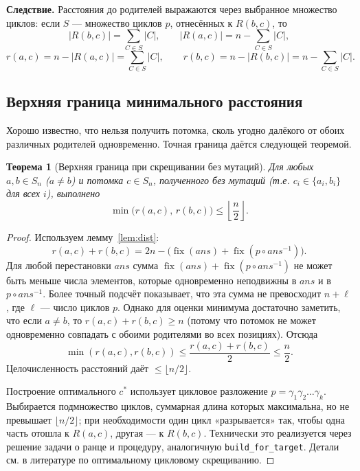 \documentclass[732]{studrep}
\DeclareMathOperator{\fix}{fix}          %
\newcommand{\ans}{\mathit{ans}}          %
\newtheorem{theorem}{Теорема}[section]
\theoremstyle{nonumberplain}
\newtheorem{proof}{Доказательство}
\begin{document}
\textbf{Следствие.} Расстояния до родителей выражаются через выбранное множество циклов: если $S$ — множество циклов $p$, отнесённых к $R(b,c)$, то
\[
|R(b,c)| = \sum_{C\in S} |C|,\qquad |R(a,c)| = n - \sum_{C\in S} |C|,
\]
\[
r(a,c) = n - |R(a,c)| = \sum_{C\in S} |C|,\qquad
r(b,c) = n - |R(b,c)| = n - \sum_{C\in S} |C|.
\]

\subsection{Верхняя граница минимального расстояния}
\label{sec:upper_bound}

Хорошо известно, что нельзя получить потомка, сколь угодно далёкого от обоих различных родителей одновременно. Точная граница даётся следующей теоремой.

\begin{theorem}[Верхняя граница при скрещивании без мутаций]\label{thm:bound}
Для любых $a,b\in S_n$ ($a\neq b$) и потомка $c\in S_n$, полученного без мутаций (т.е. $c_i\in\{a_i,b_i\}$ для всех $i$), выполнено
\[
\min\bigl(r(a,c),\, r(b,c)\bigr) \le \left\lfloor\frac{n}{2}\right\rfloor.
\]
\end{theorem}

\begin{proof}
Используем лемму~\ref{lem:dist}:
\[
r(a,c)+r(b,c) = 2n - \bigl(\fix(\ans)+\fix(p\circ\ans^{-1})\bigr).
\]
Для любой перестановки $\ans$ сумма $\fix(\ans)+\fix(p\circ\ans^{-1})$ не может быть меньше числа элементов, которые одновременно неподвижны в $\ans$ и в $p\circ\ans^{-1}$. Более точный подсчёт показывает, что эта сумма не превосходит $n + \ell$, где $\ell$ — число циклов $p$. Однако для оценки минимума достаточно заметить, что если $a\neq b$, то $r(a,c)+r(b,c) \ge n$ (потому что потомок не может одновременно совпадать с обоими родителями во всех позициях). Отсюда
\[
\min(r(a,c),r(b,c)) \le \frac{r(a,c)+r(b,c)}{2} \le \frac{n}{2}.
\]
Целочисленность расстояний даёт $\le \lfloor n/2\rfloor$.

Построение оптимального $c^*$ использует цикловое разложение $p = \gamma_1 \gamma_2 \dots \gamma_k$. Выбирается подмножество циклов, суммарная длина которых максимальна, но не превышает $\lfloor n/2\rfloor$; при необходимости один цикл «разрывается» так, чтобы одна часть отошла к $R(a,c)$, другая — к $R(b,c)$. Технически это реализуется через решение задачи о ранце и процедуру, аналогичную \texttt{build\_for\_target}. Детали см. в литературе по оптимальному цикловому скрещиванию.
\end{proof}
\end{document}
